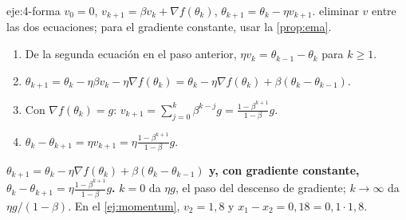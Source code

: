 \begin{solucion}{eje:4-forma}
\datos $v_0=0$, $v_{k+1}=\beta v_k+\nabla f(\theta_k)$, $\theta_{k+1}=\theta_k-\eta v_{k+1}$.
\planteamiento eliminar $v$ entre las dos ecuaciones; para el gradiente constante, usar la \cref{prop:ema}.
\pasos
\begin{enumerate}[label=\arabic*.]
  \item De la segunda ecuación en el paso anterior, $\eta v_k=\theta_{k-1}-\theta_k$ para $k\ge 1$.
  \item $\theta_{k+1}=\theta_k-\eta\beta v_k-\eta\nabla f(\theta_k)=\theta_k-\eta\nabla f(\theta_k)+\beta(\theta_k-\theta_{k-1})$.
  \item Con $\nabla f(\theta_k)=g$: $v_{k+1}=\sum_{j=0}^{k}\beta^{k-j}g=\frac{1-\beta^{k+1}}{1-\beta}g$.
  \item $\theta_k-\theta_{k+1}=\eta v_{k+1}=\eta\frac{1-\beta^{k+1}}{1-\beta}g$.
\end{enumerate}
\resultado \textbf{$\theta_{k+1}=\theta_k-\eta\nabla f(\theta_k)+\beta(\theta_k-\theta_{k-1})$ y, con gradiente constante, $\theta_k-\theta_{k+1}=\eta\frac{1-\beta^{k+1}}{1-\beta}g$.}
\comprobacion $k=0$ da $\eta g$, el paso del descenso de gradiente; $k\to\infty$ da $\eta g/(1-\beta)$. En el \cref{ej:momentum}, $v_2=1{,}8$ y $x_1-x_2=0{,}18=0{,}1\cdot 1{,}8$.
\end{solucion}

